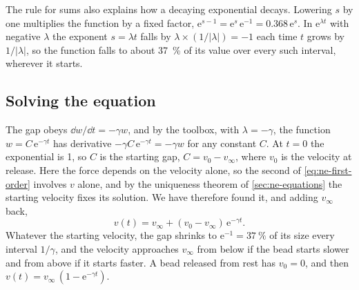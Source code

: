 The rule for sums also explains how a decaying exponential decays.
Lowering $s$ by one multiplies the function by a fixed factor,
$\mathrm{e}^{s-1} = \mathrm{e}^s\,\mathrm{e}^{-1} = 0.368\,\mathrm{e}^s$.
In $\mathrm{e}^{\lambda t}$ with negative $\lambda$ the exponent $s =
\lambda t$ falls by $\lambda\times(1/\lvert\lambda\rvert) = -1$ each time
$t$ grows by $1/\lvert\lambda\rvert$, so the function falls to about
\SI{37}{\percent} of its value over every such interval, wherever it
starts.

\subsection*{Solving the equation}

The gap obeys $\dd w/\dd t = -\gamma w$, and by the toolbox, with
$\lambda = -\gamma$, the function $w = C\,\mathrm{e}^{-\gamma t}$ has
derivative $-\gamma C\,\mathrm{e}^{-\gamma t} = -\gamma w$ for any
constant $C$. At $t = 0$ the exponential is 1, so $C$ is the starting gap,
$C = v_0 - v_\infty$, where $v_0$ is the velocity at release. Here the
force depends on the velocity alone, so the second of
\cref{eq:ne-first-order} involves $v$ alone, and by the uniqueness
theorem of \cref{sec:ne-equations} the starting velocity fixes its
solution. We have therefore found it, and adding $v_\infty$ back,
\begin{equation}
   v(t) = v_\infty + (v_0 - v_\infty)\,\mathrm{e}^{-\gamma t} .
   \label{eq:ne-drag-v}
\end{equation}
Whatever the starting velocity, the gap shrinks to $\mathrm{e}^{-1} =
\SI{37}{\percent}$ of its size every interval $1/\gamma$, and the
velocity approaches $v_\infty$ from below if the bead starts slower and
from above if it starts faster. A bead released from rest has $v_0 = 0$,
and then $v(t) = v_\infty\,(1 - \mathrm{e}^{-\gamma t})$.


